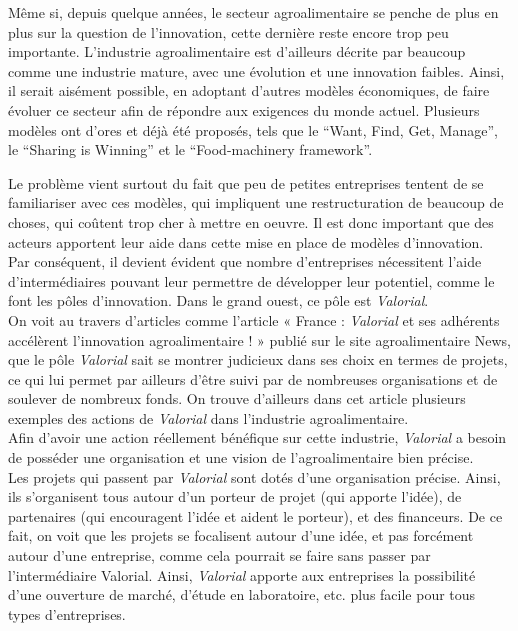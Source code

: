 \documentclass[a4paper,12pt]{report}
\begin{document}
	Même si, depuis quelque années, le secteur agroalimentaire se penche de plus en plus sur la question de l’innovation, cette dernière reste encore trop peu importante. L’industrie agroalimentaire est d’ailleurs décrite par beaucoup comme une industrie mature, avec une évolution et une innovation faibles. Ainsi, il serait aisément possible, en adoptant d’autres modèles économiques, de faire évoluer ce secteur afin de répondre aux exigences du monde actuel. Plusieurs modèles ont d’ores et déjà été proposés, tels que le “Want, Find, Get, Manage”, le “Sharing is Winning” et le “Food-machinery framework”.
	
	Le problème vient surtout du fait que peu de petites entreprises tentent de se familiariser avec ces modèles, qui impliquent une restructuration de beaucoup de choses, qui coûtent trop cher à mettre en oeuvre. Il est donc important que des acteurs apportent leur aide dans cette mise en place de modèles d’innovation.\\

	 Par conséquent, il devient évident que nombre d’entreprises nécessitent l’aide d’intermédiaires pouvant leur permettre de développer leur potentiel, comme le font les pôles d’innovation. Dans le grand ouest, ce pôle est \textit{Valorial}.\\

	On voit au travers d'articles comme l'article « France : \textit{Valorial} et ses adhérents accélèrent l'innovation agroalimentaire ! » publié sur le site agroalimentaire News, que le pôle \textit{Valorial} sait se montrer judicieux dans ses choix en termes de projets, ce qui lui permet par ailleurs d'être suivi par de nombreuses organisations et de soulever de nombreux fonds. On trouve d’ailleurs dans cet article plusieurs exemples des actions de \textit{Valorial} dans l’industrie agroalimentaire.\\

	Afin d’avoir une action réellement bénéfique sur cette industrie, \textit{Valorial} a besoin de posséder une organisation et une vision de l’agroalimentaire bien précise.\\

	Les projets qui passent par \textit{Valorial} sont dotés d’une organisation précise. Ainsi, ils s’organisent tous autour d’un porteur de projet (qui apporte l’idée), de partenaires (qui encouragent l’idée et aident le porteur), et des financeurs. De ce fait, on voit que les projets se focalisent autour d’une idée, et pas forcément autour d’une entreprise, comme cela pourrait se faire sans passer par l’intermédiaire Valorial. Ainsi, \textit{Valorial} apporte aux entreprises la possibilité d’une ouverture de marché, d’étude en laboratoire, etc. plus facile pour tous types d’entreprises. 
\end{document}
